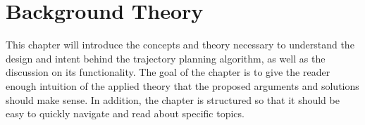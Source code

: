 \section{Background Theory}
This chapter will introduce the concepts and theory necessary to understand the design and intent behind the trajectory planning algorithm, as well as the discussion on its functionality.
The goal of the chapter is to give the reader enough intuition of the applied theory that the proposed arguments and solutions should make sense. In addition, the chapter is structured
so that it should be easy to quickly navigate and read about specific topics.


